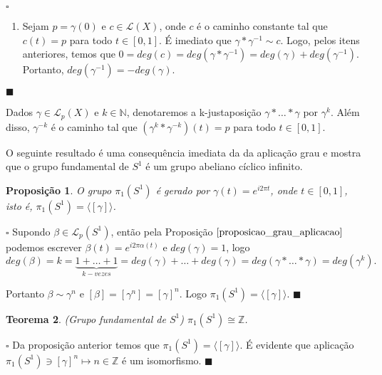 \documentclass[12pt]{book}
\newtheorem{teorema}{Teorema}[section]
\newtheorem{proposicao}[teorema]{Proposição}
\newenvironment{prova}[1]{$\square$ #1}{\hfill$\blacksquare$}
\newcommand{\caminhos}{\mathcal{L}}
\newcommand{\caminhossempontobase}[1]{\caminhos(#1)}
\newcommand{\caminhospontobasegeral}[2]{\caminhos_{#1}(#2)}
\newcommand{\circulo}{S^{1}}
\newcommand{\classe}[1]{[#1]}
\newcommand{\gerador}[1]{\langle #1\rangle}
\newcommand{\grupofundamental}[1]{\pi_{1}(#1)}
\newcommand{\inteiros}{\mathbb{Z}}
\newcommand{\intervalo}{[0,1]}
\begin{document}
\begin{prova}
\begin{enumerate}
			\item Sejam $p=\gamma(0)$ e $c\in \caminhossempontobase{X}$, onde $c$ é o caminho constante tal que $c(t)=p$ para todo $t\in \intervalo$. É imediato que $\gamma*\gamma^{-1} \sim c$. Logo, pelos itens anteriores, temos que $0=deg(c) = deg(\gamma*\gamma^{-1}) = deg(\gamma) + deg(\gamma^{-1})$. Portanto, $deg(\gamma^{-1}) = -deg(\gamma) $.
		\end{enumerate}
	\end{prova}
	
	Dados $\gamma \in \caminhospontobasegeral{p}{X}$ e $k \in \mathbb{N}$, denotaremos a k-justaposição $\gamma*\dots * \gamma$ por $\gamma^{k}$. Além disso, $\gamma^{-k}$ é o caminho tal que $(\gamma^{k}*\gamma^{-k})(t) = p$ para todo $t \in \intervalo$.
	
	O seguinte resultado é uma consequência imediata da da aplicação grau e mostra que o grupo fundamental de $\circulo$ é um grupo abeliano cíclico infinito.
	
	\begin{proposicao}\label{proposicao_gerador_grupo_fundamental_ciruclo}
		O grupo $\grupofundamental{\circulo}$ é gerado por $\gamma(t) = e^{i2\pi t}$, onde $t \in [0,1]$, isto é, $\grupofundamental{\circulo} = \gerador{\classe{\gamma}} $.
	\end{proposicao}
	\begin{prova}
		Supondo $\beta \in \caminhospontobasegeral{p}{\circulo}$, então pela Proposição $\ref{proposicao_grau_aplicacao}$ podemos escrever $\beta(t)=e^{i2\pi \alpha(t)}$ e $deg(\gamma) = 1$, logo 
		$$
		deg(\beta) = k = \underbrace{1+\dots+1}_{k-vezes} = deg(\gamma)+\dots+deg(\gamma) = deg(\gamma *\dots *\gamma) = deg(\gamma^{k}).
		$$
		
		Portanto $\beta \sim \gamma^{n}$ e $\classe{\beta} = \classe{\gamma^{n}}=\classe{\gamma}^{n}$. Logo $\grupofundamental{\circulo} = \gerador{\classe{\gamma}}$.
	\end{prova}
	
	\begin{teorema}\label{teorema_grupo_fundamental_circulo}
		(Grupo fundamental de $\circulo$) $\grupofundamental{\circulo} \cong \inteiros$.
	\end{teorema}
	\begin{prova}
		Da proposição anterior temos que $\grupofundamental{\circulo} = \gerador{\classe{\gamma}}$. É evidente que aplicação $\grupofundamental{\circulo}  \ni \classe{\gamma}^{n} \mapsto n \in \inteiros$ é um isomorfismo.
	\end{prova}
	
\end{document}
